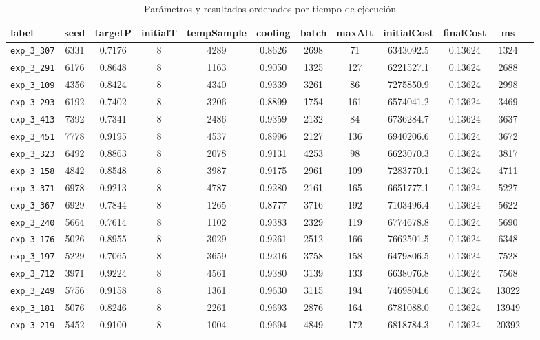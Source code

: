 \documentclass[9pt,a4paper,twocolumn,twoside]{rho-class/rho}
\begin{document}
\begin{table}[htbp]
    \centering
    \caption{Parámetros y resultados ordenados por tiempo de ejecución}
    \label{tab:resultados_exp}
    \footnotesize
    \begin{tabular}{|l|c|c|c|c|c|c|c|c|c|c|c|}
        \hline
        \textbf{label} & \textbf{seed} & \textbf{targetP} & \textbf{initialT} & \textbf{tempSample} & \textbf{cooling} & \textbf{batch} & \textbf{maxAtt} & \textbf{initialCost} & \textbf{finalCost} & \textbf{ms} \\ \hline
        \texttt{exp\_3\_307} & 6331 & 0.7176 & 8 & 4289 & 0.8626 & 2698 & 71 & 6343092.5 & 0.13624 & 1324 \\ \hline
        \texttt{exp\_3\_291} & 6176 & 0.8648 & 8 & 1163 & 0.9050 & 1325 & 127 & 6221527.1 & 0.13624 & 2688 \\ \hline
        \texttt{exp\_3\_109} & 4356 & 0.8424 & 8 & 4340 & 0.9339 & 3261 & 86 & 7275850.9 & 0.13624 & 2998 \\ \hline
        \texttt{exp\_3\_293} & 6192 & 0.7402 & 8 & 3206 & 0.8899 & 1754 & 161 & 6574041.2 & 0.13624 & 3469 \\ \hline
        \texttt{exp\_3\_413} & 7392 & 0.7341 & 8 & 2486 & 0.9359 & 2132 & 84 & 6736284.7 & 0.13624 & 3637 \\ \hline
        \texttt{exp\_3\_451} & 7778 & 0.9195 & 8 & 4537 & 0.8996 & 2127 & 136 & 6940206.6 & 0.13624 & 3672 \\ \hline
        \texttt{exp\_3\_323} & 6492 & 0.8863 & 8 & 2078 & 0.9131 & 4253 & 98 & 6623070.3 & 0.13624 & 3817 \\ \hline
        \texttt{exp\_3\_158} & 4842 & 0.8548 & 8 & 3987 & 0.9175 & 2961 & 109 & 7283770.1 & 0.13624 & 4711 \\ \hline
        \texttt{exp\_3\_371} & 6978 & 0.9213 & 8 & 4787 & 0.9280 & 2161 & 165 & 6651777.1 & 0.13624 & 5227 \\ \hline
        \texttt{exp\_3\_367} & 6929 & 0.7844 & 8 & 1265 & 0.8777 & 3716 & 192 & 7103496.4 & 0.13624 & 5622 \\ \hline
        \texttt{exp\_3\_240} & 5664 & 0.7614 & 8 & 1102 & 0.9383 & 2329 & 119 & 6774678.8 & 0.13624 & 5690 \\ \hline
        \texttt{exp\_3\_176} & 5026 & 0.8955 & 8 & 3029 & 0.9261 & 2512 & 166 & 7662501.5 & 0.13624 & 6348 \\ \hline
        \texttt{exp\_3\_197} & 5229 & 0.7065 & 8 & 3659 & 0.9216 & 3758 & 158 & 6479806.5 & 0.13624 & 7528 \\ \hline
        \texttt{exp\_3\_712} & 3971 & 0.9224 & 8 & 4561 & 0.9380 & 3139 & 133 & 6638076.8 & 0.13624 & 7568 \\ \hline
        \texttt{exp\_3\_249} & 5756 & 0.9158 & 8 & 1361 & 0.9630 & 3115 & 194 & 7469804.6 & 0.13624 & 13022 \\ \hline
        \texttt{exp\_3\_181} & 5076 & 0.8246 & 8 & 2261 & 0.9693 & 2876 & 164 & 6781088.0 & 0.13624 & 13949 \\ \hline
        \texttt{exp\_3\_219} & 5452 & 0.9100 & 8 & 1004 & 0.9694 & 4849 & 172 & 6818784.3 & 0.13624 & 20392 \\ \hline
    \end{tabular}
\end{table}
\end{document}
